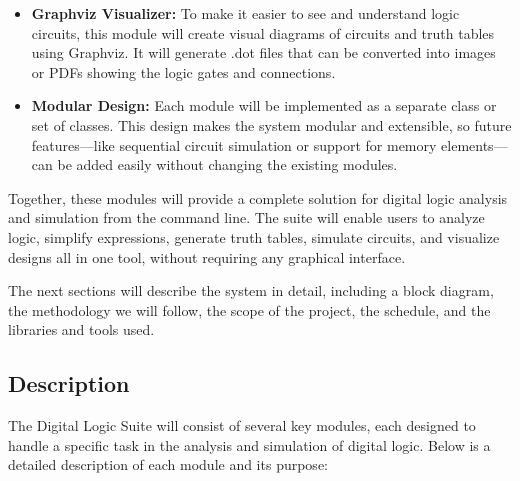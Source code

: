 \begin{itemize}
    \item \textbf{Graphviz Visualizer:} To make it easier to see and understand logic circuits, this module will create visual diagrams of circuits and truth tables using Graphviz. It will generate .dot files that can be converted into images or PDFs showing the logic gates and connections.

    \item \textbf{Modular Design:} Each module will be implemented as a separate class or set of classes. This design makes the system modular and extensible, so future features—like sequential circuit simulation or support for memory elements—can be added easily without changing the existing modules.
\end{itemize}

Together, these modules will provide a complete solution for digital logic analysis and simulation from the command line. The suite will enable users to analyze logic, simplify expressions, generate truth tables, simulate circuits, and visualize designs all in one tool, without requiring any graphical interface.

The next sections will describe the system in detail, including a block diagram, the methodology we will follow, the scope of the project, the schedule, and the libraries and tools used.

\clearpage
\subsection{Description}

The Digital Logic Suite will consist of several key modules, each designed to handle a specific task in the analysis and simulation of digital logic. Below is a detailed description of each module and its purpose:

